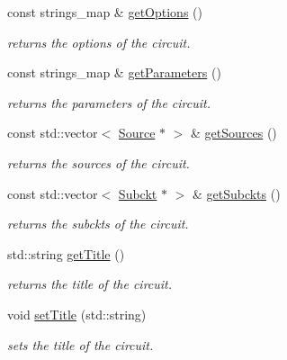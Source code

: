 \begin{DoxyCompactItemize}
\mbox{\label{class_s_p_i_c_e_1_1_circuit_a4ee11ef79ef893c5621e0e7d26a7f9a7}} 
const strings\+\_\+map \& \hyperlink{class_s_p_i_c_e_1_1_circuit_a4ee11ef79ef893c5621e0e7d26a7f9a7}{get\+Options} ()
\begin{DoxyCompactList}\small\item\em returns the options of the circuit. \end{DoxyCompactList}\item 
\mbox{\label{class_s_p_i_c_e_1_1_circuit_a4c46676f9ead2db537a0dd963b4f08f1}} 
const strings\+\_\+map \& \hyperlink{class_s_p_i_c_e_1_1_circuit_a4c46676f9ead2db537a0dd963b4f08f1}{get\+Parameters} ()
\begin{DoxyCompactList}\small\item\em returns the parameters of the circuit. \end{DoxyCompactList}\item 
\mbox{\label{class_s_p_i_c_e_1_1_circuit_ac18caa525ed386c44874ee643c88e27b}} 
const std\+::vector$<$ \hyperlink{class_s_p_i_c_e_1_1_source}{Source} $\ast$ $>$ \& \hyperlink{class_s_p_i_c_e_1_1_circuit_ac18caa525ed386c44874ee643c88e27b}{get\+Sources} ()
\begin{DoxyCompactList}\small\item\em returns the sources of the circuit. \end{DoxyCompactList}\item 
\mbox{\label{class_s_p_i_c_e_1_1_circuit_adcc4ca0de68f8ee05f0d5db3b7604930}} 
const std\+::vector$<$ \hyperlink{class_s_p_i_c_e_1_1_subckt}{Subckt} $\ast$ $>$ \& \hyperlink{class_s_p_i_c_e_1_1_circuit_adcc4ca0de68f8ee05f0d5db3b7604930}{get\+Subckts} ()
\begin{DoxyCompactList}\small\item\em returns the subckts of the circuit. \end{DoxyCompactList}\item 
\mbox{\label{class_s_p_i_c_e_1_1_circuit_ad19721dd878c04c854a72af12d785741}} 
std\+::string \hyperlink{class_s_p_i_c_e_1_1_circuit_ad19721dd878c04c854a72af12d785741}{get\+Title} ()
\begin{DoxyCompactList}\small\item\em returns the title of the circuit. \end{DoxyCompactList}\item 
void \hyperlink{class_s_p_i_c_e_1_1_circuit_a798df9ebd558e22c85eeceb5202e3123}{set\+Title} (std\+::string)
\begin{DoxyCompactList}\small\item\em sets the title of the circuit. \end{DoxyCompactList}\end{DoxyCompactItemize}


